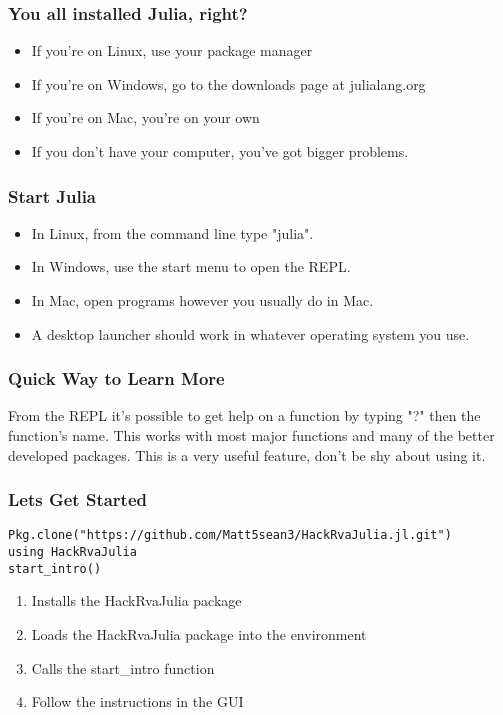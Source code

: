 \documentclass{beamer}
\begin{document}
\begin{frame}
\frametitle{You all installed Julia, right?}
\begin{itemize}
  \item If you're on Linux, use your package manager
  \item If you're on Windows, go to the downloads page at julialang.org
  \item If you're on Mac, you're on your own
  \item If you don't have your computer, you've got bigger problems.
\end{itemize}
\end{frame}

\begin{frame}
\frametitle{Start Julia}
\begin{itemize}
  \item In Linux, from the command line type "julia".
  \item In Windows, use the start menu to open the REPL.
  \item In Mac, open programs however you usually do in Mac.
  \item A desktop launcher should work in whatever operating system you use.
\end{itemize}
\end{frame}

\begin{frame}
\frametitle{Quick Way to Learn More}
From the REPL it's possible to get help on a function by typing "?" then the
function's name. This works with most major functions and many of the better
developed packages. This is a very useful feature, don't be shy about using it.
\end{frame}

\begin{frame}[fragile]
\frametitle{Lets Get Started}
\begin{verbatim}
Pkg.clone("https://github.com/Matt5sean3/HackRvaJulia.jl.git")
using HackRvaJulia
start_intro()
\end{verbatim}
\begin{enumerate}
  \item Installs the HackRvaJulia package
  \item Loads the HackRvaJulia package into the environment
  \item Calls the start\_intro function
  \item Follow the instructions in the GUI
\end{enumerate}
\end{frame}
\end{document}
